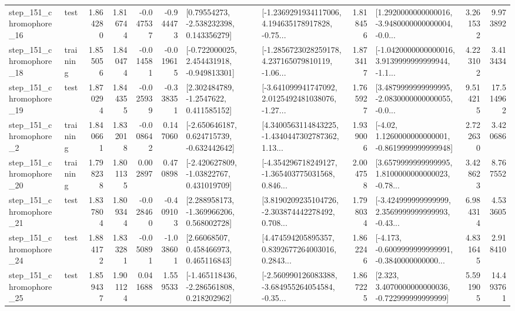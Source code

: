 \begin{tabular}{llrrrrllrlrr}
  step\_151\_chromophore\_16 &      test &      1.864280 &    1.816744 &     -0.047537 & -0.944473 &     [0.79554273, -2.538232398, 0.143356279] &  [-1.2369291934117006, 4.194635178917828, -0.75... &       1.818456 &  [1.2920000000000016, -3.9480000000000004, -0.0... &            3.261532 &          9.973892 \\
  step\_151\_chromophore\_18 &  training &      1.855056 &    1.840474 &     -0.014581 & -0.019615 &   [-0.722000025, 2.454431918, -0.949813301] &  [-1.2856723028259178, 4.237165079810119, -1.06... &       1.873417 &  [-1.0420000000000016, 3.9139999999999944, -1.1... &            4.223102 &          3.413434 \\
  step\_151\_chromophore\_19 &      test &      1.870294 &    1.844355 &     -0.025939 & -0.338351 &      [2.302484789, -1.2547622, 0.411585152] &  [-3.641099941747092, 2.0125492481038076, -1.27... &       1.765927 &  [3.4879999999999995, -2.0830000000000055, -0.0... &            9.514215 &         17.514962 \\
   step\_151\_chromophore\_2 &  training &      1.840661 &    1.832018 &     -0.008642 &  0.147060 &   [-2.650646187, 0.624715739, -0.632442642] &  [4.3400563114843225, -1.4340447302787362, 1.13... &       1.939006 &   [-4.02, 1.1260000000000001, -0.8619999999999948] &            2.722630 &          3.420686 \\
  step\_151\_chromophore\_20 &  training &      1.798238 &    1.801135 &      0.002897 &  0.470898 &    [-2.420627809, -1.03822767, 0.431019709] &  [-4.354296718249127, -1.365403775031568, 0.846... &       2.004758 &  [3.6579999999999995, 1.8100000000000023, -0.78... &            3.428623 &          8.767552 \\
  step\_151\_chromophore\_21 &      test &      1.837804 &    1.809344 &     -0.028460 & -0.409103 &    [2.288958173, -1.369966206, 0.568002728] &  [3.8190209235104726, -2.303874442278492, 0.708... &       1.798034 &  [-3.424999999999999, 2.3569999999999993, -0.43... &            6.984314 &          4.533605 \\
  step\_151\_chromophore\_24 &      test &      1.884172 &    1.833281 &     -0.050891 & -1.038601 &      [2.66068507, 0.458466973, 0.465116843] &  [4.474594205895357, 0.8392677264003016, 0.2843... &       1.862246 &  [-4.173, -0.6009999999999991, -0.3840000000000... &            4.831645 &          2.918410 \\
  step\_151\_chromophore\_25 &      test &      1.859437 &    1.901124 &      0.041688 &  1.559533 &   [-1.465118436, -2.286561808, 0.218202962] &  [-2.560990126083388, -3.684955264054584, -0.35... &       1.867225 &    [2.323, 3.4070000000000036, -0.722999999999999] &            5.591905 &         14.493761 \\

\end{tabular}
